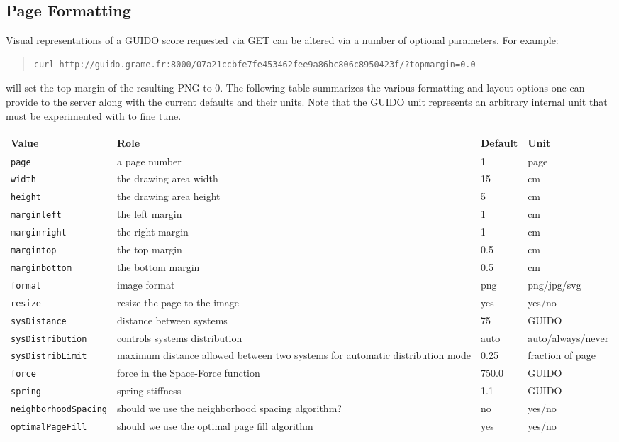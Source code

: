 \documentclass[a4paper]{article}
\begin{document}
\subsection{Page Formatting}
Visual representations of a GUIDO score requested via GET can be altered via a number of optional parameters.  For example:
\begin{quote}
\begingroup
\fontsize{7.5pt}{12pt}\selectfont
\begin{verbatim}
curl http://guido.grame.fr:8000/07a21ccbfe7fe453462fee9a86bc806c8950423f/?topmargin=0.0
\end{verbatim}
\endgroup
\end{quote}
will set the top margin of the resulting PNG to 0.  The following table summarizes the various formatting and layout options one can provide to the server along with the current defaults and their units.  Note that the GUIDO unit represents an arbitrary internal unit that must be experimented with to fine tune.\par
\begin{longtable}{|l|p{4cm}|l|l|}\hline
Value & Role & Default & Unit \\\hline
\verb=page= & a page number & 1 & page \\\hline
\verb=width= & the drawing area width & 15 & cm \\\hline
\verb=height= & the drawing area height & 5 & cm \\\hline
\verb=marginleft= & the left margin & 1 & cm \\\hline
\verb=marginright= & the right margin & 1 & cm \\\hline
\verb=margintop= & the top margin & 0.5 & cm \\\hline
\verb=marginbottom= & the bottom margin & 0.5 & cm \\\hline
\verb=format= & image format & png & png/jpg/svg \\\hline
\verb=resize= & resize the page to the image & yes & yes/no \\\hline
\verb=sysDistance= & distance between systems & 75 & GUIDO \\\hline
\verb=sysDistribution= & controls systems distribution & auto & auto/always/never\\\hline
\verb=sysDistribLimit= & maximum distance allowed between two systems for automatic distribution mode & 0.25 & fraction of page \\\hline
\verb=force= & force in the Space-Force function & 750.0 & GUIDO \\\hline
\verb=spring= & spring stiffness & 1.1 & GUIDO \\\hline
\verb=neighborhoodSpacing= & should we use the neighborhood spacing algorithm? & no & yes/no \\\hline
\verb=optimalPageFill= & should we use the optimal page fill algorithm & yes & yes/no\\\hline
\end{longtable}
\end{document}
